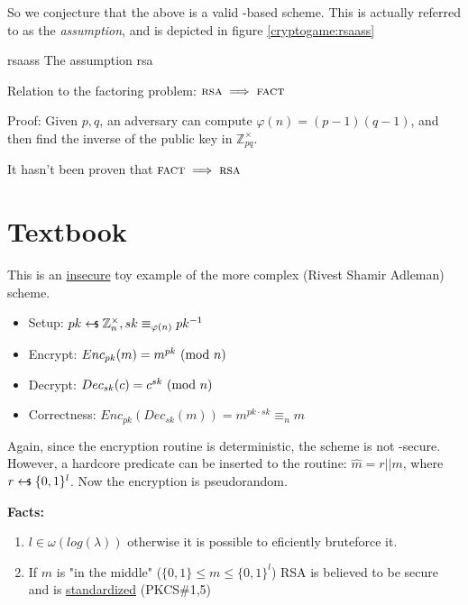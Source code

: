 So we conjecture that the above is a valid \tdp-based \pke{} scheme. This is actually referred to as the \emph{\rsa{} assumption}, and is depicted in figure \ref{cryptogame:rsaass}

\begin{cryptogame}
    {rsaass}
    {The \rsa{} assumption}
    {rsa}


    \cseqdelay


\end{cryptogame}


Relation to the factoring problem: $\textsc{rsa} \implies \textsc{fact}$

Proof: Given $p, q$, an adversary can compute $\varphi(n) = (p-1)(q-1)$, and then find the inverse of the public key in $\mathbb{Z}_{pq}^\times$.

It hasn't been proven that $\textsc{fact} \implies \textsc{rsa}$


\section{Textbook \rsa}
This is an \underline{insecure} toy example of the more complex \rsa{} (Rivest Shamir Adleman) scheme.

\begin{itemize}
    \item Setup: $pk \pickUAR \integer_n^\times, sk \equiv_{\varphi(n)} pk^{-1}$
    \item Encrypt: $Enc_{pk}(m) = m^{pk} \ (\mathrm{mod}\ n)$
    \item Decrypt: $Dec_{sk}(c) = c^{sk} \ (\mathrm{mod}\ n)$
    \item Correctness: $Enc_{pk}(Dec_{sk}(m)) = m^{pk \cdot sk} \equiv_n m$
\end{itemize}

Again, since the encryption routine is deterministic, the scheme is not \cpa-secure. However, a hardcore predicate can be inserted to the routine: $\hat{m} = r||m$, where $r \pickUAR \{0, 1\}^l$. Now the encryption is pseudorandom.

\textbf{Facts:}
\begin{enumerate}
    \item $l \in \omega(log(\lambda))$ otherwise it is possible to eficiently bruteforce it.
    \item If $m$ is "in the middle" ($\{0,1\} \leq m \leq \{0, 1\}^l$) RSA is believed to be secure and is \underline{standardized} (PKCS\#1,5)
\end{enumerate}


